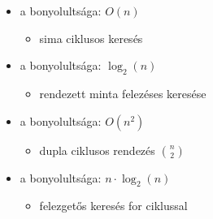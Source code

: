 \documentclass[main.tex]{subfiles}
\begin{document}
  \begin{itemize}
    \item a  bonyolultsága: $O(n)$
    \begin{itemize}
      \item sima  ciklusos keresés
    \end{itemize}

    \item a  bonyolultsága: $\log_2(n)$
    \begin{itemize}
      \item rendezett minta felezéses keresése
    \end{itemize}
  \end{itemize}

  \begin{itemize}
    \item a  bonyolultsága: $O(n^2)$
    \begin{itemize}
      \item dupla  ciklusos rendezés $\binom{n}{2}$
    \end{itemize}

    \item a  bonyolultsága: $n \cdot \log_2(n)$
    \begin{itemize}
      \item felezgetős keresés for ciklussal
    \end{itemize}
  \end{itemize}
\end{document}
